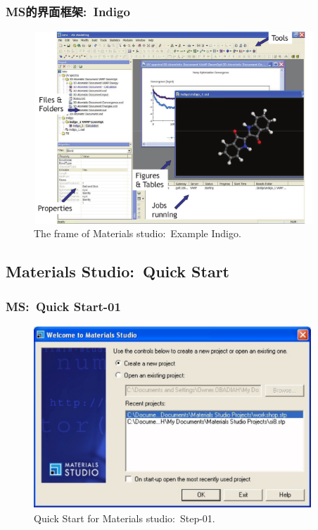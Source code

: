 {
	\frametitle{\textrm{MS}的界面框架:~\textrm{Indigo}}
\begin{figure}[h!]
\centering
\vspace*{-0.28in}
\includegraphics[height=2.85in,width=4.15in,viewport=0 0 1140 800,clip]{Figures/MS-Frame_example.png}
\caption{\tiny \textrm{The frame of Materials studio:~Example Indigo.}}%
\label{MS-Frame_example}
\end{figure}
}

\subsection{\rm{Materials Studio:~Quick Start}}
\frame
{
	\frametitle{\textrm{MS:~Quick Start-01}}
\begin{figure}[h!]
\centering
\vspace*{-0.21in}
\includegraphics[height=2.70in,width=4.10in,viewport=0 0 1134 740,clip]{Figures/MS-New_Project-01.png}
\caption{\tiny \textrm{Quick Start for Materials studio:~Step-01.}}%
\label{MS-Quick_Start-01}
\end{figure}
}

